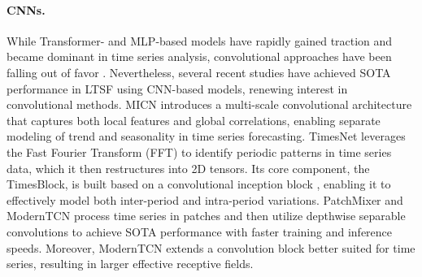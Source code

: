 \documentclass[a4paper,oneside,bibliography=totoc]{scrbook}
\begin{document}
\paragraph{CNNs.}
While Transformer- and MLP-based models have rapidly gained traction and became dominant in time series analysis, convolutional approaches have been falling out of favor \cite{donghao_moderntcn_2023}. 
Nevertheless, several recent studies have achieved SOTA performance in LTSF using CNN-based models, renewing interest in convolutional methods.
MICN \cite{wang_micn_2022} introduces a multi-scale convolutional architecture that captures both local features and global correlations, enabling separate modeling of trend and seasonality in time series forecasting.
TimesNet \cite{wu_timesnet_2022} leverages the Fast Fourier Transform (FFT) to identify periodic patterns in time series data, which it then restructures into 2D tensors. Its core component, the TimesBlock, is built based on a convolutional inception block \cite{szegedy_going_2015}, enabling it to effectively model both inter-period and intra-period variations.
PatchMixer \cite{gong_patchmixer_2024} and ModernTCN \cite{donghao_moderntcn_2023} process time series in patches \cite{nie_time_2022} and then utilize depthwise separable convolutions to achieve SOTA performance with faster training and inference speeds.
Moreover, ModernTCN extends a convolution block better suited for time series, resulting in larger effective receptive fields. %

% 
% 
\end{document}
